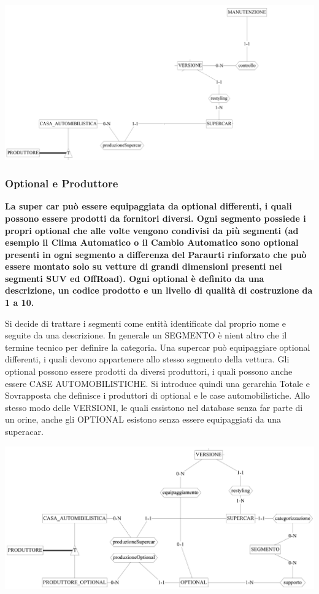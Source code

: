 \documentclass[11pt]{article}
\begin{document}
\begin{center}
    \includegraphics[width=\linewidth]{images/partialSchemes/versione.png}
\end{center}

\subsubsection{Optional e Produttore}
\textbf{La super car può essere equipaggiata da optional differenti, i quali
possono essere prodotti da fornitori diversi. Ogni segmento possiede i propri
optional che alle volte vengono condivisi da più segmenti (ad esempio il Clima
Automatico o il Cambio Automatico sono optional presenti in ogni segmento a
differenza del Paraurti rinforzato che può essere montato solo su vetture di
grandi dimensioni presenti nei segmenti SUV ed OffRoad). Ogni optional è
definito da una descrizione, un codice prodotto e un livello di qualità di
costruzione da 1 a 10.}

Si decide di trattare i segmenti come entità identificate dal proprio nome e
seguite da una descrizione. In generale un SEGMENTO è nient altro che il termine
tecnico per definire la categoria. Una supercar può equipaggiare optional
differenti, i quali devono appartenere allo stesso segmento della vettura. Gli
optional possono essere prodotti da diversi produttori, i quali possono anche
essere CASE AUTOMOBILISTICHE. Si introduce quindi una gerarchia Totale e
Sovrapposta che definisce i produttori di optional e le case automobilistiche.
Allo stesso modo delle VERSIONI, le quali essistono nel database senza far parte
di un orine, anche gli OPTIONAL esistono senza essere equipaggiati da una superacar.

\begin{center}
    \includegraphics[width=\linewidth]{images/partialSchemes/optional.png}
\end{center}
\end{document}
